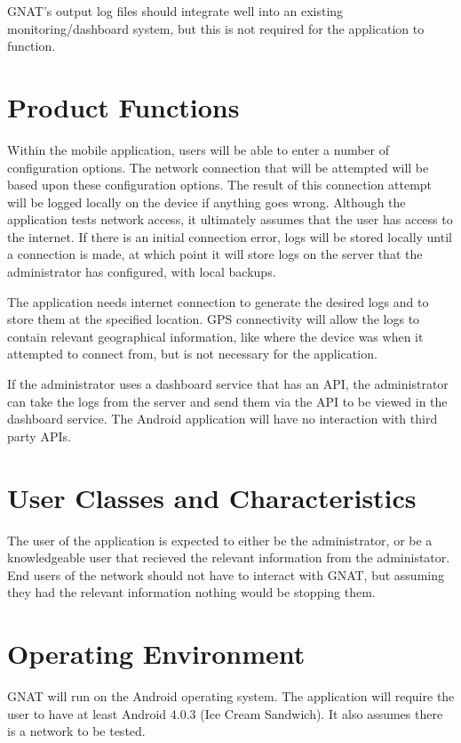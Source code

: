 \documentclass{scrreprt}
\begin{document}
GNAT's output log files should integrate well into an existing monitoring/dashboard system, but this is not required for the application to function.


\section{Product Functions}

Within the mobile application, users will be able to enter a number of configuration options.  The network connection that will be attempted will be based upon these configuration options.  The result of this connection attempt will be logged locally on the device if anything goes wrong. Although the application tests network access, it ultimately assumes that the user has access to the internet.  If there is an initial connection error, logs will be stored locally until a connection is made, at which point it will store logs on the server that the administrator has configured, with local backups.

The application needs internet connection to generate the desired logs and to store them at the specified location. GPS connectivity will allow the logs to contain relevant geographical information, like where the device was when it attempted to connect from, but is not necessary for the application.

If the administrator uses a dashboard service that has an API, the administrator can take the logs from the server and send them via the API to be viewed in the dashboard service. The Android application will have no interaction with third party APIs.
 
\section{User Classes and Characteristics}
The user of the application is expected to either be the administrator, or be a knowledgeable user that recieved the relevant information from the administator.  End users of the network should not have to interact with GNAT, but assuming they had the relevant information nothing would be stopping them.

\section{Operating Environment}
GNAT will run on the Android operating system.  The application will require the user to have at least Android 4.0.3 (Ice Cream Sandwich). It also assumes there is a network to be tested.
\end{document}
